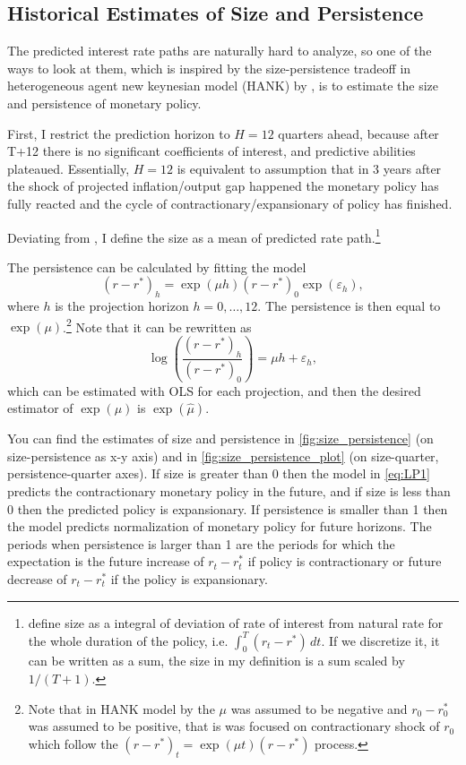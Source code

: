 \documentclass[11pt]{article}
\begin{document}
\subsection{Historical Estimates of Size and Persistence}
\label{sec:size_persistence}


The predicted interest rate paths are naturally hard to analyze, so one of the ways to look at them, which is inspired by the size-persistence tradeoff in heterogeneous agent new keynesian model (HANK) by \citet{KMV2018}, is to estimate the size and persistence of monetary policy. 

First, I restrict the prediction horizon to $H=12$ quarters ahead, because after T+12 there is no significant coefficients of interest, and predictive abilities plateaued. 
Essentially, $H=12$ is equivalent to assumption that in 3 years after the shock of projected inflation/output gap happened the monetary policy has fully reacted and the cycle of contractionary/expansionary of policy has finished.

Deviating from \citet{KMV2018}, I define the size as a mean of predicted rate path.\footnote{\citet{KMV2018} define size as a integral of deviation of rate of interest from natural rate for the whole duration of the policy, i.e. $\int_0^T \left(r_t-r^*\right)\,dt$. If we discretize it, it can be written as a sum, the size in my definition is a sum scaled by $1/(T+1)$.} 

The persistence can be calculated by fitting the model 
\[\left(r-r^*\right)_h=\exp(\mu h)\left(r-r^*\right)_0\exp(\varepsilon_h),\]
where $h$ is the projection horizon $h=0,\dots, 12$. 
The persistence is then equal to $\exp(\mu)$.\footnote{Note that in HANK model by \citet{KMV2018} the $\mu$ was assumed to be negative and $r_0-r_0^*$ was assumed to be positive, that is \citet{KMV2018} was focused on contractionary shock of $r_0$ which follow the $\left(r-r^*\right)_t=\exp(\mu t)\left(r-r^*\right)$ process.} Note that it can be rewritten as
\[\log\left(\frac{\left(r-r^*\right)_h}{\left(r-r^*\right)_{0}}\right)=\mu h+\varepsilon_h,\]
which can be estimated with OLS for each projection, and then the desired estimator of $\exp(\mu)$ is $\exp(\hat \mu)$. 


You can find the estimates of size and persistence in \vref{fig:size_persistence} (on size-persistence as x-y axis) and in \vref{fig:size_persistence_plot} (on size-quarter, persistence-quarter axes).
If size is greater than 0 then the model in \vref{eq:LP1} predicts the contractionary monetary policy in the future, and if size is less than 0 then the predicted policy is expansionary. 
If persistence is smaller than 1 then the model predicts normalization of monetary policy for future horizons. 
The periods when persistence is larger than 1 are the periods for which the expectation is the future increase of $r_t-r_t^*$ if policy is contractionary or future decrease of $r_t-r_t^*$ if the policy is expansionary.
\end{document}
